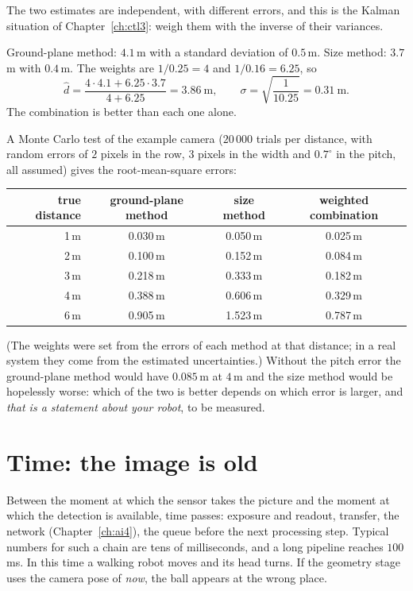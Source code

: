 The two estimates are independent, with different errors, and this is the Kalman situation of Chapter~\ref{ch:ctl3}: weigh them with the inverse of their variances.
\begin{example}
Ground-plane method: $4.1$\,m with a standard deviation of $0.5$\,m. Size method: $3.7$\,m with $0.4$\,m. The weights are $1/0.25=4$ and $1/0.16=6.25$, so
\[
\hat d=\frac{4\cdot4.1+6.25\cdot3.7}{4+6.25}=3.86\ \text{m},\qquad \sigma=\sqrt{\frac{1}{10.25}}=0.31\ \text{m}.
\]
The combination is better than each one alone.
\end{example}
A Monte Carlo test of the example camera ($20\,000$ trials per distance, with random errors of $2$ pixels in the row, $3$ pixels in the width and $0.7^{\circ}$ in the pitch, all assumed) gives the root-mean-square errors:
\begin{center}\small
\begin{tabular}{r c c c}
\hline
true distance & ground-plane method & size method & weighted combination\\\hline
1\,m & 0.030\,m & 0.050\,m & 0.025\,m\\
2\,m & 0.100\,m & 0.152\,m & 0.084\,m\\
3\,m & 0.218\,m & 0.333\,m & 0.182\,m\\
4\,m & 0.388\,m & 0.606\,m & 0.329\,m\\
6\,m & 0.905\,m & 1.523\,m & 0.787\,m\\\hline
\end{tabular}
\end{center}
(The weights were set from the errors of each method at that distance; in a real system they come from the estimated uncertainties.) Without the pitch error the ground-plane method would have $0.085$\,m at $4$\,m and the size method would be hopelessly worse: which of the two is better depends on which error is larger, and \emph{that is a statement about your robot}, to be measured.

\section*{Time: the image is old}
Between the moment at which the sensor takes the picture and the moment at which the detection is available, time passes: exposure and readout, transfer, the network (Chapter~\ref{ch:ai4}), the queue before the next processing step. Typical numbers for such a chain are tens of milliseconds, and a long pipeline reaches $100$\,ms. In this time a walking robot moves and its head turns. If the geometry stage uses the camera pose of \emph{now}, the ball appears at the wrong place.

